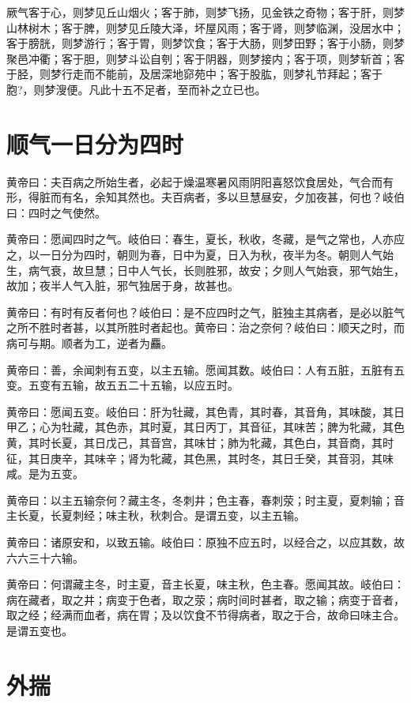 \documentclass[a4paper,12pt,UTF8,twoside]{ctexbook}
\begin{document}
	厥气客于心，则梦见丘山烟火；客于肺，则梦飞扬，见金铁之奇物；客于肝，则梦山林树木；客于脾，则梦见丘陵大泽，坏屋风雨；客于肾，则梦临渊，没居水中；客于膀胱，则梦游行；客于胃，则梦饮食；客于大肠，则梦田野；客于小肠，则梦聚邑冲衢；客于胆，则梦斗讼自刳；客于阴器，则梦接内；客于项，则梦斩首；客于胫，则梦行走而不能前，及居深地窌苑中；客于股肱，则梦礼节拜起；客于胞?，则梦溲便。凡此十五不足者，至而补之立已也。
	\chapter{顺气一日分为四时}
	
	黄帝曰：夫百病之所始生者，必起于燥温寒暑风雨阴阳喜怒饮食居处，气合而有形，得脏而有名，余知其然也。夫百病者，多以旦慧昼安，夕加夜甚，何也？岐伯曰：四时之气使然。
	
	黄帝曰：愿闻四时之气。岐伯曰：春生，夏长，秋收，冬藏，是气之常也，人亦应之，以一日分为四时，朝则为春，日中为夏，日入为秋，夜半为冬。朝则人气始生，病气衰，故旦慧；日中人气长，长则胜邪，故安；夕则人气始衰，邪气始生，故加；夜半人气入脏，邪气独居于身，故甚也。
	
	黄帝曰：有时有反者何也？岐伯曰：是不应四时之气，脏独主其病者，是必以脏气之所不胜时者甚，以其所胜时者起也。黄帝曰：治之奈何？岐伯曰：顺天之时，而病可与期。顺者为工，逆者为麤。
	
	黄帝曰：善，余闻刺有五变，以主五输。愿闻其数。岐伯曰：人有五脏，五脏有五变。五变有五输，故五五二十五输，以应五时。
	
	黄帝曰：愿闻五变。岐伯曰：肝为牡藏，其色青，其时春，其音角，其味酸，其日甲乙；心为牡藏，其色赤，其时夏，其日丙丁，其音征，其味苦；脾为牝藏，其色黄，其时长夏，其日戊己，其音宫，其味甘；肺为牝藏，其色白，其音商，其时征，其日庚辛，其味辛；肾为牝藏，其色黑，其时冬，其日壬癸，其音羽，其味咸。是为五变。
	
	黄帝曰：以主五输奈何？藏主冬，冬刺井；色主春，春刺荥；时主夏，夏刺输；音主长夏，长夏刺经；味主秋，秋刺合。是谓五变，以主五输。
	
	黄帝曰：诸原安和，以致五输。岐伯曰：原独不应五时，以经合之，以应其数，故六六三十六输。
	
	黄帝曰：何谓藏主冬，时主夏，音主长夏，味主秋，色主春。愿闻其故。岐伯曰：病在藏者，取之井；病变于色者，取之荥；病时间时甚者，取之输；病变于音者，取之经；经满而血者，病在胃；及以饮食不节得病者，取之于合，故命曰味主合。是谓五变也。

	\chapter{外揣}
\end{document}
